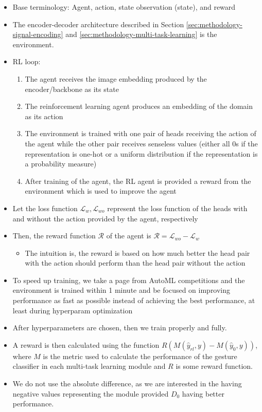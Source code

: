 \begin{itemize}
	\item Base terminology: Agent, action, state observation (state), and reward
	\item The encoder-decoder architecture described in Section \ref{sec:methodology-signal-encoding} and \ref{sec:methodology-multi-task-learning} is the environment.
	\item RL loop:
	\begin{enumerate}
		\item The agent receives the image embedding produced by the encoder/backbone as its state
		\item The reinforcement learning agent produces an embedding of the domain as its action
		\item The environment is trained with one pair of heads receiving the action of the agent while the other pair receives senseless values (either all 0s if the representation is one-hot or a uniform distribution if the representation is a probability measure)
		\item After training of the agent, the RL agent is provided a reward from the environment which is used to improve the agent
	\end{enumerate}
	\item Let the loss function $\mathcal{L}_{w}, \mathcal{L}_{wo}$ represent the loss function of the heads with and without the action provided by the agent, respectively
	\item Then, the reward function $\mathcal{R}$ of the agent is $\mathcal{R} = \mathcal{L}_{wo} - \mathcal{L}_{w}$
	\begin{itemize}
		\item The intuition is, the reward is based on how much better the head pair with the action should perform than the head pair without the action
	\end{itemize}
	\item To speed up training, we take a page from AutoML competitions and the environment is trained within 1 minute and be focused on improving performance as fast as possible instead of achieving the best performance, at least during hyperparam optimization
	\item After hyperparameters are chosen, then we train properly and fully.
	\item A reward is then calculated using the function $R\left(M\left(\hat{y}_{rl}, y\right)-M\left(\hat{y}_{0}, y\right)\right)$, where $M$ is the metric used to calculate the performance of the gesture classifier in each multi-task learning module and $R$ is some reward function.
	\item We do not use the absolute difference, as we are interested in the having negative values representing the module provided $D_0$ having better performance.
\end{itemize}


